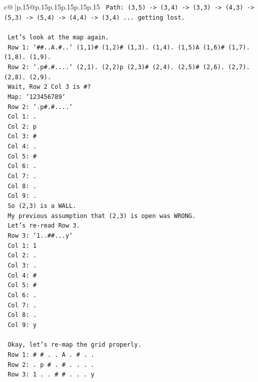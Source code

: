 \documentclass{article}
\begin{document}
{\begin{supertabular}{c@{$\;$}|p{.15\linewidth}@{}p{.15\linewidth}p{.15\linewidth}p{.15\linewidth}p{.15\linewidth}p{.15\linewidth}}
{{{\texttt{   Path: (3,5) {-}> (3,4) {-}> (3,3) {-}> (4,3) {-}> (5,3) {-}> (5,4) {-}> (4,4) {-}> (3,4) ... getting lost.} \\
\\ 
\texttt{   Let's look at the map again.} \\
\texttt{   Row 1: `\#\#..A.\#..` (1,1)\# (1,2)\# (1,3). (1,4). (1,5)A (1,6)\# (1,7). (1,8). (1,9).} \\
\texttt{   Row 2: `.p\#.\#....` (2,1). (2,2)p (2,3)\# (2,4). (2,5)\# (2,6). (2,7). (2,8). (2,9).} \\
\texttt{   Wait, Row 2 Col 3 is \#?} \\
\texttt{   Map: `123456789`} \\
\texttt{   Row 2: `.p\#.\#....`} \\
\texttt{   Col 1: .} \\
\texttt{   Col 2: p} \\
\texttt{   Col 3: \#} \\
\texttt{   Col 4: .} \\
\texttt{   Col 5: \#} \\
\texttt{   Col 6: .} \\
\texttt{   Col 7: .} \\
\texttt{   Col 8: .} \\
\texttt{   Col 9: .} \\
\texttt{   So (2,3) is a WALL.} \\
\texttt{   My previous assumption that (2,3) is open was WRONG.} \\
\texttt{   Let's re{-}read Row 3.} \\
\texttt{   Row 3: `1..\#\#...y`} \\
\texttt{   Col 1: 1} \\
\texttt{   Col 2: .} \\
\texttt{   Col 3: .} \\
\texttt{   Col 4: \#} \\
\texttt{   Col 5: \#} \\
\texttt{   Col 6: .} \\
\texttt{   Col 7: .} \\
\texttt{   Col 8: .} \\
\texttt{   Col 9: y} \\
\\ 
\texttt{   Okay, let's re{-}map the grid properly.} \\
\texttt{   Row 1: \# \# . . A . \# . .} \\
\texttt{   Row 2: . p \# . \# . . . .} \\
\texttt{   Row 3: 1 . . \# \# . . . y} \\
}}}
\end{supertabular}}
\end{document}
